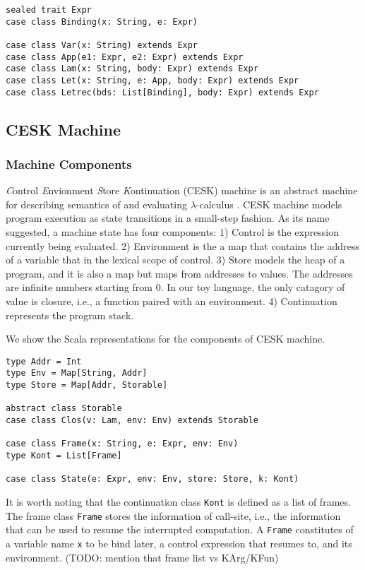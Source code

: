 \documentclass[acmsmall,review,anonymous]{acmart}\settopmatter{printfolios=true,printccs=false,printacmref=false}
\begin{document}
\begin{verbatim}
sealed trait Expr
case class Binding(x: String, e: Expr)

case class Var(x: String) extends Expr
case class App(e1: Expr, e2: Expr) extends Expr
case class Lam(x: String, body: Expr) extends Expr
case class Let(x: String, e: App, body: Expr) extends Expr
case class Letrec(bds: List[Binding], body: Expr) extends Expr
\end{verbatim}

\subsection{CESK Machine} \label{cesk}

\subsubsection{Machine Components}

\textit{C}ontrol \textit{E}nvionment \textit{S}tore \textit{K}ontinuation (CESK) machine is an
abstract machine for describing semantics of and evaluating $\lambda$-calculus \cite{felleisen1987calculus}.
CESK machine models program execution as state transitions in a small-step fashion. As its name suggested,
a machine state has four components: 1) Control is the expression currently being evaluated.
2) Environment is the a map that contains the address of a variable that in the lexical
scope of control.
3) Store models the heap of a program, and it is also a map but maps from addresses to values.
The addresses are infinite numbers starting from 0.
In our toy language, the only catagory of value is closure, i.e., a function paired with an environment.
4) Continuation represents the program stack.

We show the Scala representations for the components of CESK machine.

\begin{verbatim}
type Addr = Int
type Env = Map[String, Addr]
type Store = Map[Addr, Storable]

abstract class Storable
case class Clos(v: Lam, env: Env) extends Storable

case class Frame(x: String, e: Expr, env: Env)
type Kont = List[Frame]

case class State(e: Expr, env: Env, store: Store, k: Kont)
\end{verbatim}

It is worth noting that the continuation class \texttt{Kont} is defined as a list of frames.
The frame class \texttt{Frame} stores the information of call-site, i.e., the information that
can be used to resume the interrupted computation.
A \texttt{Frame} constitutes of a variable name \texttt{x} to be bind later, a control expression
that resumes to, and its environment. (TODO: mention that frame list vs KArg/KFun)
\end{document}

